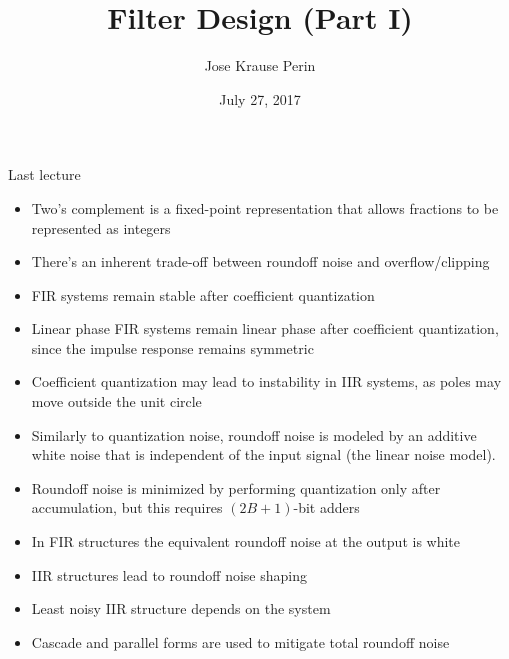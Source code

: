 \documentclass[10pt, handout]{beamer}
\title[EE 264]{Filter Design (Part I)}
\author{Jose Krause Perin}
\institute{Stanford University}
\date{July 27, 2017}
\begin{document}
\begin{frame}
  \titlepage
\end{frame}

%

%
\begin{frame}{Last lecture}
\begin{itemize}
	\item Two's complement is a fixed-point representation that allows fractions to be represented as integers
	\item There's an inherent trade-off between roundoff noise and overflow/clipping
	\item FIR systems remain stable after coefficient quantization
	\item Linear phase FIR systems remain linear phase after coefficient quantization, since the impulse response remains symmetric
	\item Coefficient quantization may lead to instability in IIR systems, as poles may move outside the unit circle
	\item Similarly to quantization noise, roundoff noise is modeled by an additive white noise that is independent of the input signal (the linear noise model).
	\item Roundoff noise is minimized by performing quantization only after accumulation, but this requires $(2B+1)$-bit adders
	\item In FIR structures the equivalent roundoff noise at the output is white
	\item IIR structures lead to roundoff noise shaping
	\item Least noisy IIR structure depends on the system
	\item Cascade and parallel forms are used to mitigate total roundoff noise
\end{itemize}
\end{frame}
\end{document}
